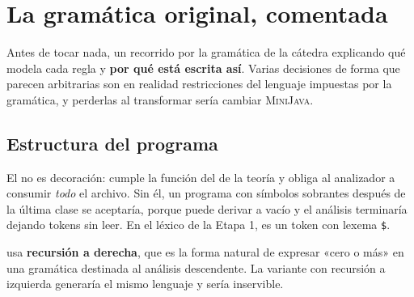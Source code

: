 \section{La gramática original, comentada}

Antes de tocar nada, un recorrido por la gramática de la cátedra explicando qué modela cada regla
y \textbf{por qué está escrita así}. Varias decisiones de forma que parecen arbitrarias son en
realidad restricciones del lenguaje impuestas por la gramática, y perderlas al transformar sería
cambiar \textsc{MiniJava}.

\subsection{Estructura del programa}

\begin{producciones}
\end{producciones}

El  no es decoración: cumple la función del \tl{\$} de la teoría y obliga al analizador a
consumir \emph{todo} el archivo. Sin él, un programa con símbolos sobrantes después de la última
clase se aceptaría, porque  puede derivar a vacío y el análisis terminaría dejando
tokens sin leer. En el léxico de la Etapa 1,  es un token con lexema \texttt{\$}.

 usa \textbf{recursión a derecha}, que es la forma natural de expresar «cero o
más» en una gramática destinada al análisis descendente. La variante con recursión a izquierda
generaría el mismo lenguaje y sería inservible.

\begin{producciones}
\end{producciones}

